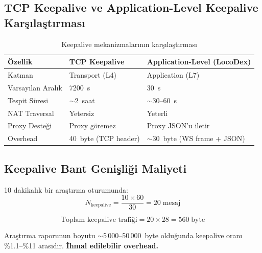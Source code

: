 \subsection{TCP Keepalive ve Application-Level Keepalive Kar\c{s}{\i}la\c{s}t{\i}rmas{\i}}
\label{sec:keepalive-comparison}

\begin{table}[H]
\centering
\caption{Keepalive mekanizmalar{\i}n{\i}n kar\c{s}{\i}la\c{s}t{\i}rmas{\i}}
\label{tab:keepalive}
\begin{tabularx}{\textwidth}{lXX}
\toprule
\color{chapterBlue}\textbf{\"{O}zellik} & \color{chapterBlue}\textbf{TCP Keepalive} & \color{chapterBlue}\textbf{Application-Level (LocoDex)} \\
\midrule
Katman            & Transport (L4) & Application (L7) \\
Varsay{\i}lan Aral{\i}k & 7200~s         & 30~s \\
Tespit S\"{u}resi     & $\sim$2~saat      & $\sim$30--60~s \\
NAT Traversal     & Yetersiz       & Yeterli \\
Proxy Deste\u{g}i     & Proxy g\"{o}remez  & Proxy JSON'u iletir \\
Overhead          & 40~byte (TCP header) & $\sim$30~byte (WS frame + JSON) \\
\bottomrule
\end{tabularx}
\end{table}

\subsection{Keepalive Bant Geni\c{s}li\u{g}i Maliyeti}
\label{sec:keepalive-cost}

10 dakikal{\i}k bir ara\c{s}t{\i}rma oturumunda:
\begin{equation}
\label{eq:keepalive-count}
N_{\mathrm{keepalive}} = \frac{10 \times 60}{30} = 20 \;\text{mesaj}
\end{equation}

\begin{equation}
\label{eq:keepalive-cost}
\text{Toplam keepalive trafi\u{g}i} = 20 \times 28 = 560 \;\text{byte}
\end{equation}

Ara\c{s}t{\i}rma raporunun boyutu $\sim$5\,000--50\,000~byte oldu\u{g}unda keepalive oran{\i} \%1.1--\%11 aras{\i}d{\i}r. \textbf{\.{I}hmal edilebilir overhead.}


